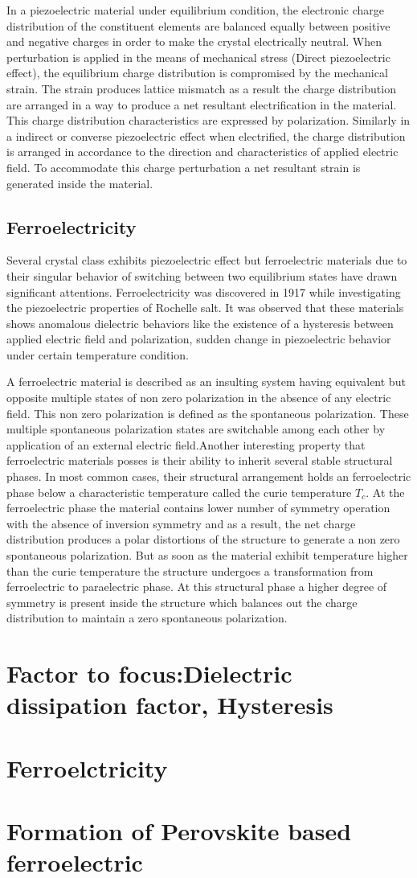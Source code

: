 In a piezoelectric material under equilibrium condition, the electronic charge distribution of the constituent elements are balanced equally between positive and negative charges in order to make the crystal electrically neutral. When perturbation is applied in the means of mechanical stress (Direct piezoelectric effect), the equilibrium charge distribution is compromised by the mechanical strain. The strain produces lattice mismatch as a result the charge distribution are arranged in a way to produce a net resultant electrification in the material. This charge distribution characteristics are expressed by polarization. Similarly in a indirect or converse piezoelectric effect when electrified, the charge distribution is arranged in accordance to the direction and characteristics of applied electric field. To accommodate this charge perturbation a net resultant strain is generated inside the material.

\subsection{Ferroelectricity}
Several crystal class exhibits piezoelectric effect but ferroelectric materials due to their singular behavior of switching between two equilibrium states have drawn significant attentions. Ferroelectricity was discovered in 1917 while investigating the piezoelectric properties of Rochelle salt. It was observed that these materials shows anomalous dielectric behaviors like the existence of a hysteresis between applied electric field and polarization, sudden change in piezoelectric behavior under certain temperature condition.

A ferroelectric material is described as an insulting system having equivalent but opposite multiple states of non zero polarization in the absence of any electric field. This non zero polarization is defined as the spontaneous polarization. These multiple spontaneous polarization states are switchable among each other by application of an external electric field.Another interesting property that ferroelectric materials posses is their ability to inherit several stable structural phases. In most common cases, their structural arrangement holds an ferroelectric phase below a characteristic temperature called the curie temperature $T_{c}$. At the ferroelectric phase the material contains lower number of symmetry operation with the absence of inversion symmetry and as a result, the net charge distribution produces a polar distortions of the structure to generate a non zero spontaneous polarization. But as soon as the material exhibit temperature higher than the curie temperature the structure undergoes a transformation from ferroelectric to paraelectric phase. At this structural phase a higher degree of symmetry is present inside the structure which balances out the charge distribution to maintain a zero spontaneous polarization.


\section{Factor to focus:Dielectric dissipation factor, Hysteresis}
\section{Ferroelctricity}
\section{Formation of Perovskite based ferroelectric}

